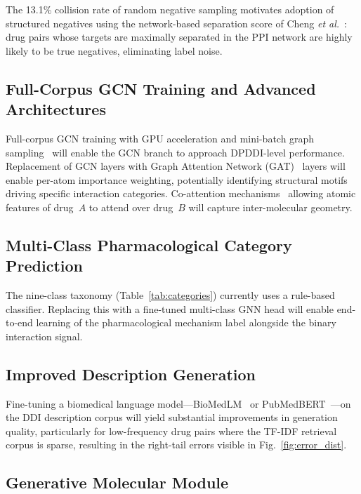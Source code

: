 \documentclass[conference]{IEEEtran}
\begin{document}
The 13.1\% collision rate of random negative sampling motivates adoption of structured
negatives using the network-based separation score of Cheng \textit{et
al.}~\cite{cheng2012network}: drug pairs whose targets are maximally separated in the PPI
network are highly likely to be true negatives, eliminating label noise.

\subsection{Full-Corpus GCN Training and Advanced Architectures}

Full-corpus GCN training with GPU acceleration and mini-batch graph
sampling~\cite{gilmer2017mpnn} will enable the GCN branch to approach DPDDI-level
performance. Replacement of GCN layers with Graph Attention Network
(GAT)~\cite{velickovic2018gat} layers will enable per-atom importance weighting,
potentially identifying structural motifs driving specific interaction categories. Co-attention
mechanisms~\cite{deac2019drug} allowing atomic features of drug~$A$ to attend over drug~$B$
will capture inter-molecular geometry.

\subsection{Multi-Class Pharmacological Category Prediction}

The nine-class taxonomy (Table~\ref{tab:categories}) currently uses a rule-based classifier.
Replacing this with a fine-tuned multi-class GNN head will enable end-to-end learning of
the pharmacological mechanism label alongside the binary interaction signal.

\subsection{Improved Description Generation}

Fine-tuning a biomedical language model---BioMedLM~\cite{bolton2022biomedlm} or
PubMedBERT~\cite{gu2021pubmedbert}---on the DDI description corpus will yield substantial
improvements in generation quality, particularly for low-frequency drug pairs where the
TF-IDF retrieval corpus is sparse, resulting in the right-tail errors visible in
Fig.~\ref{fig:error_dist}.

\subsection{Generative Molecular Module}
\end{document}
